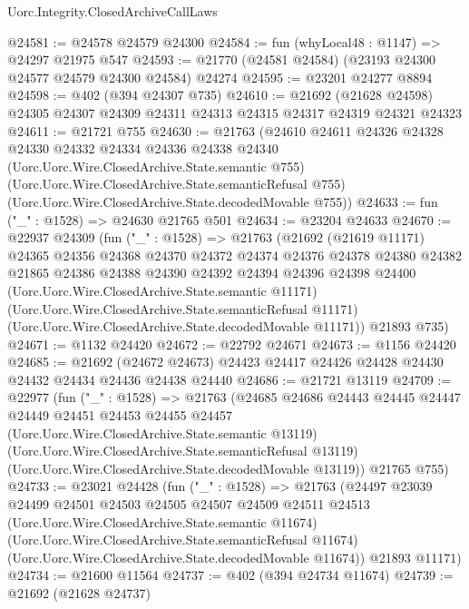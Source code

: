 \begin{lexlean}{Uorc.Integrity.ClosedArchiveCallLaws}
\begin{coremodule}
@24581 := @24578 @24579 @24300
@24584 := fun (whyLocal48 : @1147) => @24297 @21975 @547
@24593 := @21770 (@24581 @24584) (@23193 @24300 @24577 @24579 @24300 @24584) @24274
@24595 := @23201 @24277 @8894
@24598 := @402 (@394 @24307 @735)
@24610 := @21692
    (@21628 @24598)
    @24305
    @24307
    @24309
    @24311
    @24313
    @24315
    @24317
    @24319
    @24321
    @24323
@24611 := @21721 @755
@24630 := @21763
    (@24610
      @24611
      @24326
      @24328
      @24330
      @24332
      @24334
      @24336
      @24338
      @24340
      (Uorc.Uorc.Wire.ClosedArchive.State.semantic @755)
      (Uorc.Uorc.Wire.ClosedArchive.State.semanticRefusal @755)
      (Uorc.Uorc.Wire.ClosedArchive.State.decodedMovable @755))
@24633 := fun ("_" : @1528) => @24630 @21765 @501
@24634 := @23204 @24633
@24670 := @22937
    @24309
    (fun ("_" : @1528) =>
    @21763
      (@21692
        (@21619 @11171)
        @24365
        @24356
        @24368
        @24370
        @24372
        @24374
        @24376
        @24378
        @24380
        @24382
        @21865
        @24386
        @24388
        @24390
        @24392
        @24394
        @24396
        @24398
        @24400
        (Uorc.Uorc.Wire.ClosedArchive.State.semantic @11171)
        (Uorc.Uorc.Wire.ClosedArchive.State.semanticRefusal @11171)
        (Uorc.Uorc.Wire.ClosedArchive.State.decodedMovable @11171))
      @21893
      @735)
@24671 := @1132 @24420
@24672 := @22792 @24671
@24673 := @1156 @24420
@24685 := @21692
    (@24672 @24673)
    @24423
    @24417
    @24426
    @24428
    @24430
    @24432
    @24434
    @24436
    @24438
    @24440
@24686 := @21721 @13119
@24709 := @22977
    (fun ("_" : @1528) =>
    @21763
      (@24685
        @24686
        @24443
        @24445
        @24447
        @24449
        @24451
        @24453
        @24455
        @24457
        (Uorc.Uorc.Wire.ClosedArchive.State.semantic @13119)
        (Uorc.Uorc.Wire.ClosedArchive.State.semanticRefusal @13119)
        (Uorc.Uorc.Wire.ClosedArchive.State.decodedMovable @13119))
      @21765
      @755)
@24733 := @23021
    @24428
    (fun ("_" : @1528) =>
    @21763
      (@24497
        @23039
        @24499
        @24501
        @24503
        @24505
        @24507
        @24509
        @24511
        @24513
        (Uorc.Uorc.Wire.ClosedArchive.State.semantic @11674)
        (Uorc.Uorc.Wire.ClosedArchive.State.semanticRefusal @11674)
        (Uorc.Uorc.Wire.ClosedArchive.State.decodedMovable @11674))
      @21893
      @11171)
@24734 := @21600 @11564
@24737 := @402 (@394 @24734 @11674)
@24739 := @21692 (@21628 @24737)

\end{coremodule}
\end{lexlean}
